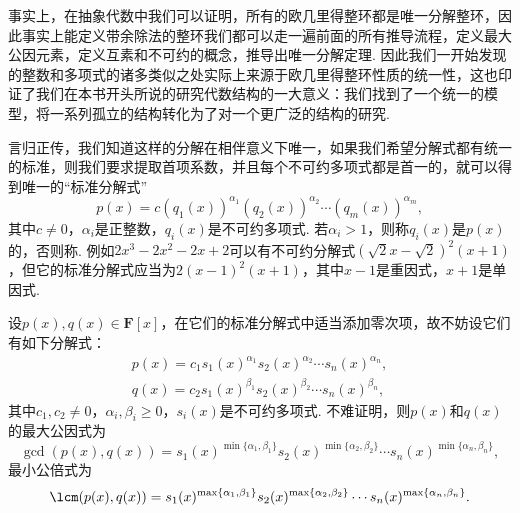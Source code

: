事实上，在抽象代数中我们可以证明，所有的欧几里得整环都是唯一分解整环，因此事实上能定义带余除法的整环我们都可以走一遍前面的所有推导流程，定义最大公因元素，定义互素和不可约的概念，推导出唯一分解定理. 因此我们一开始发现的整数和多项式的诸多类似之处实际上来源于欧几里得整环性质的统一性，这也印证了我们在本书开头所说的研究代数结构的一大意义：我们找到了一个统一的模型，将一系列孤立的结构转化为了对一个更广泛的结构的研究.

言归正传，我们知道这样的分解在相伴意义下唯一，如果我们希望分解式都有统一的标准，则我们要求提取首项系数，并且每个不可约多项式都是首一的，就可以得到唯一的``标准分解式''
\[p(x)=c(q_1(x))^{\alpha_1}(q_2(x))^{\alpha_2}\cdots(q_m(x))^{\alpha_m},\]
其中$c\neq 0$，$\alpha_i$是正整数，$q_i(x)$是不可约多项式. 若$\alpha_i>1$，则称$q_i(x)$是$p(x)$的，否则称. 例如$2x^3-2x^2-2x+2$可以有不可约分解式$(\sqrt{2}x-\sqrt{2})^2(x+1)$，但它的标准分解式应当为$2(x-1)^2(x+1)$，其中$x-1$是重因式，$x+1$是单因式.
\begin{example} \label{ex:14:标准分解式与gcd和lcm}
    设$p(x),q(x)\in\mathbf{F}[x]$，在它们的标准分解式中适当添加零次项，故不妨设它们有如下分解式：
    \begin{gather*}
        p(x)=c_1s_1(x)^{\alpha_1}s_2(x)^{\alpha_2}\cdots s_n(x)^{\alpha_n},\\
        q(x)=c_2s_1(x)^{\beta_1}s_2(x)^{\beta_2}\cdots s_n(x)^{\beta_n},
    \end{gather*}
    其中$c_1,c_2\neq 0$，$\alpha_i,\beta_i\geqslant 0$，$s_i(x)$是不可约多项式. 不难证明，则$p(x)$和$q(x)$的最大公因式为
    \[\gcd(p(x),q(x))=s_1(x)^{\min\{\alpha_1,\beta_1\}}s_2(x)^{\min\{\alpha_2,\beta_2\}}\cdots s_n(x)^{\min\{\alpha_n,\beta_n\}},\]
    最小公倍式为
    \[\lcm(p(x),q(x))=s_1(x)^{\max\{\alpha_1,\beta_1\}}s_2(x)^{\max\{\alpha_2,\beta_2\}}\cdots s_n(x)^{\max\{\alpha_n,\beta_n\}}.\]
\end{example}

